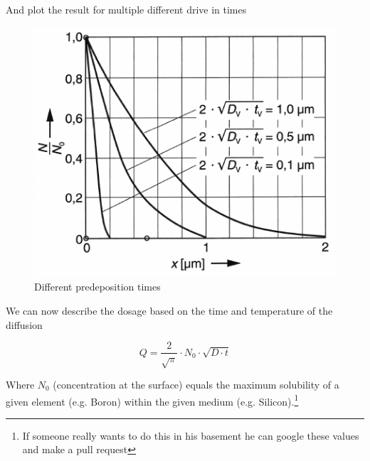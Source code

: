 And plot the result for multiple different drive in times
\begin{figure}[H]
	\centering
	\includegraphics[scale=0.5]{dopants_depth.png}
	\caption{Different predeposition times}
\end{figure}

We can now describe the dosage based on the time and temperature of the diffusion

\begin{equation}
Q=\frac{2}{\sqrt{\pi}} \cdot N_0 \cdot \sqrt{D \cdot t}
\end{equation}

Where $N_0$ (concentration at the surface) equals the maximum solubility of a given element (e.g. Boron) within the given medium (e.g. Silicon).\footnote{If someone really wants to do this in his basement he can google these values and make a pull request}
